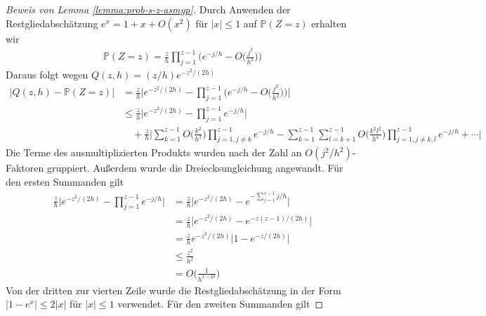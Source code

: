 \documentclass[a4paper, 11pt, ngerman]{article}
\renewcommand{\P}{\mathbb{P}}
\theoremstyle{definition}
\theoremstyle{plain}
\theoremstyle{remark}
\begin{document}
\begin{proof}[Beweis von Lemma \ref{lemma:prob-s-z-asmyp}]
    Durch Anwenden der Restgliedabschätzung $e^x = 1 + x + O(x^2)$ für $|x| \le 1$ auf $\P(Z = z)$ erhalten wir
    \begin{align*}
        \P(Z = z) = \frac z h \prod_{j = 1}^{z - 1}
        \Bigg ( e^{-j/h} - O \bigg (\frac {j^2} {h^2} \bigg ) \Bigg )
    \end{align*}
    Daraus folgt wegen $Q(z, h) = (z/h)e^{-z^2/(2h)}$
    \begin{align*}
        \vert Q(z, h) - \P(Z = z) \vert
         & = \frac z h \Bigg \vert
        e^{-z^2/(2h)} -
        \prod_{j = 1}^{z - 1}
        \Bigg ( e^{-j/h} - O \bigg (\frac {j^2} {h^2} \bigg ) \Bigg )
        \Bigg \vert                      \\
         & \le \frac z h \Bigg \vert
        e^{-z^2/(2h)} -
        \prod_{j = 1}^{z - 1} e^{-j/h}
        \Bigg \vert                      \\
         & \quad + \frac z h \Bigg \vert
        \sum_{k = 1}^{z - 1} O \bigg ( \frac {k^2} {h^2} \bigg )
        \prod_{j = 1, j \ne k}^{z - 1} e^{-j/h}
        - \sum_{k = 1}^{z - 1}\sum_{l = k+1}^{z - 1}
        O \bigg ( \frac {k^2l^2} {h^4} \bigg )
        \prod_{j = 1, j \ne k,l}^{z - 1} e^{-j/h}
        + \cdots
        \Bigg \vert
    \end{align*}
    Die Terme des ausmultiplizierten Produkts wurden nach der Zahl an $O(j^2/h^2)$-Faktoren gruppiert. Außerdem wurde die Dreiecksungleichung angewandt. Für den ersten Summanden gilt
    \begin{align*}
        \frac z h \Bigg \vert
        e^{-z^2/(2h)} -
        \prod_{j = 1}^{z - 1} e^{-j/h}
        \Bigg \vert
         & = \frac z h \Big \vert
        e^{-z^2/(2h)} -
        e^{-\sum_{j = 1}^{z - 1} j/h}
        \Big \vert                                       \\
         & = \frac z h \Big \vert
        e^{-z^2/(2h)} -  e^{-z(z - 1)/(2h)}
        \Big \vert                                       \\
         & = \frac z h e^{-z^2/(2h)} \Big \vert
        1 - e^{-z/(2h)}
        \Big \vert                                       \\
         & \le \frac {z^2} {h^2}                         \\
         & = O \bigg ( \frac 1 {h^{1 - 2\delta}} \bigg )
    \end{align*}
    Von der dritten zur vierten Zeile wurde die Restgliedabschätzung in der Form $|1 - e^x| \le 2|x|$ für $|x| \le 1$ verwendet. Für den zweiten Summanden gilt

\end{proof}
\end{document}
